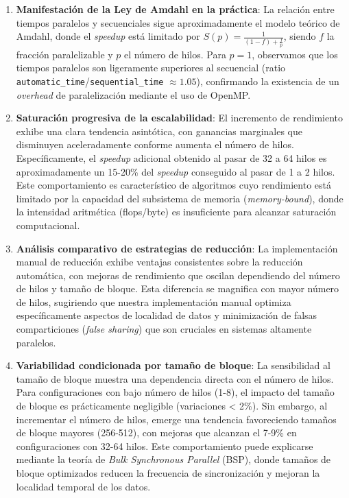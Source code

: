         \begin{enumerate}
        
            \item \textbf{Manifestación de la Ley de Amdahl en la práctica}: La relación entre tiempos paralelos y secuenciales sigue aproximadamente el modelo teórico de Amdahl, donde el \textit{speedup} está limitado por $S(p) = \frac{1}{(1-f) + \frac{f}{p}}$, siendo $f$ la fracción paralelizable y $p$ el número de hilos. Para $p=1$, observamos que los tiempos paralelos son ligeramente superiores al secuencial (ratio \texttt{automatic\_time}/\texttt{sequential\_time} $\approx 1.05$), confirmando la existencia de un \textit{overhead} de paralelización mediante el uso de OpenMP.
            
            \item \textbf{Saturación progresiva de la escalabilidad}: El incremento de rendimiento exhibe una clara tendencia asintótica, con ganancias marginales que disminuyen aceleradamente conforme aumenta el número de hilos. Específicamente, el \textit{speedup} adicional obtenido al pasar de 32 a 64 hilos es aproximadamente un 15-20\% del \textit{speedup} conseguido al pasar de 1 a 2 hilos. Este comportamiento es característico de algoritmos cuyo rendimiento está limitado por la capacidad del subsistema de memoria (\textit{memory-bound}), donde la intensidad aritmética (flops/byte) es insuficiente para alcanzar saturación computacional.
        
            \item \textbf{Análisis comparativo de estrategias de reducción}: La implementación manual de reducción exhibe ventajas consistentes sobre la reducción automática, con mejoras de rendimiento que oscilan dependiendo del número de hilos y tamaño de bloque. Esta diferencia se magnifica con mayor número de hilos, sugiriendo que nuestra implementación manual optimiza específicamente aspectos de localidad de datos y minimización de falsas comparticiones (\textit{false sharing}) que son cruciales en sistemas altamente paralelos.
        
            \item \textbf{Variabilidad condicionada por tamaño de bloque}: La sensibilidad al tamaño de bloque muestra una dependencia directa con el número de hilos. Para configuraciones con bajo número de hilos (1-8), el impacto del tamaño de bloque es prácticamente negligible (variaciones < 2\%). Sin embargo, al incrementar el número de hilos, emerge una tendencia favoreciendo tamaños de bloque mayores (256-512), con mejoras que alcanzan el 7-9\% en configuraciones con 32-64 hilos. Este comportamiento puede explicarse mediante la teoría de \textit{Bulk Synchronous Parallel} (BSP), donde tamaños de bloque optimizados reducen la frecuencia de sincronización y mejoran la localidad temporal de los datos.
            

\end{enumerate}
